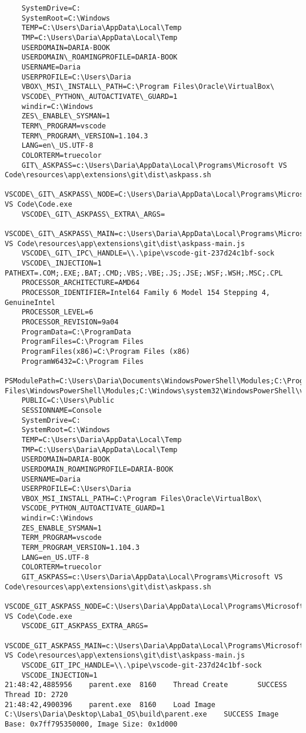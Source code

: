 \begin{verbatim}
	SystemDrive=C:
	SystemRoot=C:\Windows
	TEMP=C:\Users\Daria\AppData\Local\Temp
	TMP=C:\Users\Daria\AppData\Local\Temp
	USERDOMAIN=DARIA-BOOK
	USERDOMAIN\_ROAMINGPROFILE=DARIA-BOOK
	USERNAME=Daria
	USERPROFILE=C:\Users\Daria
	VBOX\_MSI\_INSTALL\_PATH=C:\Program Files\Oracle\VirtualBox\
	VSCODE\_PYTHON\_AUTOACTIVATE\_GUARD=1
	windir=C:\Windows
	ZES\_ENABLE\_SYSMAN=1
	TERM\_PROGRAM=vscode
	TERM\_PROGRAM\_VERSION=1.104.3
	LANG=en\_US.UTF-8
	COLORTERM=truecolor
	GIT\_ASKPASS=c:\Users\Daria\AppData\Local\Programs\Microsoft VS Code\resources\app\extensions\git\dist\askpass.sh
	VSCODE\_GIT\_ASKPASS\_NODE=C:\Users\Daria\AppData\Local\Programs\Microsoft VS Code\Code.exe
	VSCODE\_GIT\_ASKPASS\_EXTRA\_ARGS=
	VSCODE\_GIT\_ASKPASS\_MAIN=c:\Users\Daria\AppData\Local\Programs\Microsoft VS Code\resources\app\extensions\git\dist\askpass-main.js
	VSCODE\_GIT\_IPC\_HANDLE=\\.\pipe\vscode-git-237d24c1bf-sock
	VSCODE\_INJECTION=1
PATHEXT=.COM;.EXE;.BAT;.CMD;.VBS;.VBE;.JS;.JSE;.WSF;.WSH;.MSC;.CPL
	PROCESSOR_ARCHITECTURE=AMD64
	PROCESSOR_IDENTIFIER=Intel64 Family 6 Model 154 Stepping 4, GenuineIntel
	PROCESSOR_LEVEL=6
	PROCESSOR_REVISION=9a04
	ProgramData=C:\ProgramData
	ProgramFiles=C:\Program Files
	ProgramFiles(x86)=C:\Program Files (x86)
	ProgramW6432=C:\Program Files
	PSModulePath=C:\Users\Daria\Documents\WindowsPowerShell\Modules;C:\Program Files\WindowsPowerShell\Modules;C:\Windows\system32\WindowsPowerShell\v1.0\Modules
	PUBLIC=C:\Users\Public
	SESSIONNAME=Console
	SystemDrive=C:
	SystemRoot=C:\Windows
	TEMP=C:\Users\Daria\AppData\Local\Temp
	TMP=C:\Users\Daria\AppData\Local\Temp
	USERDOMAIN=DARIA-BOOK
	USERDOMAIN_ROAMINGPROFILE=DARIA-BOOK
	USERNAME=Daria
	USERPROFILE=C:\Users\Daria
	VBOX_MSI_INSTALL_PATH=C:\Program Files\Oracle\VirtualBox\
	VSCODE_PYTHON_AUTOACTIVATE_GUARD=1
	windir=C:\Windows
	ZES_ENABLE_SYSMAN=1
	TERM_PROGRAM=vscode
	TERM_PROGRAM_VERSION=1.104.3
	LANG=en_US.UTF-8
	COLORTERM=truecolor
	GIT_ASKPASS=c:\Users\Daria\AppData\Local\Programs\Microsoft VS Code\resources\app\extensions\git\dist\askpass.sh
	VSCODE_GIT_ASKPASS_NODE=C:\Users\Daria\AppData\Local\Programs\Microsoft VS Code\Code.exe
	VSCODE_GIT_ASKPASS_EXTRA_ARGS=
	VSCODE_GIT_ASKPASS_MAIN=c:\Users\Daria\AppData\Local\Programs\Microsoft VS Code\resources\app\extensions\git\dist\askpass-main.js
	VSCODE_GIT_IPC_HANDLE=\\.\pipe\vscode-git-237d24c1bf-sock
	VSCODE_INJECTION=1
21:48:42,4885956	parent.exe	8160	Thread Create		SUCCESS	Thread ID: 2720
21:48:42,4900396	parent.exe	8160	Load Image	C:\Users\Daria\Desktop\Laba1_OS\build\parent.exe	SUCCESS	Image Base: 0x7ff795350000, Image Size: 0x1d000

\end{verbatim}
